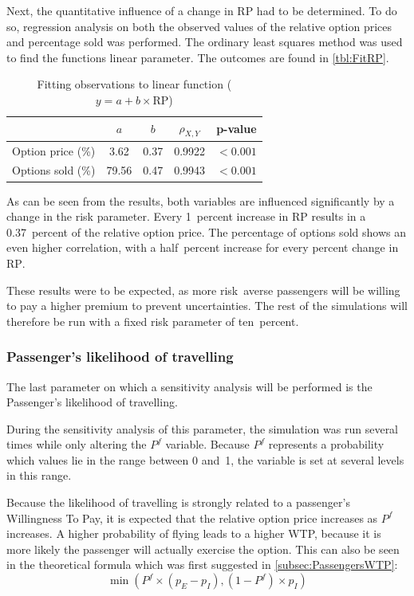 Next, the quantitative influence of a change in $\mbox{RP}$ had to be determined. To do so, regression analysis on both the observed values of the relative option prices and percentage sold was performed. The ordinary least squares method was used to find the functions linear parameter. The outcomes are found in \autoref{tbl:FitRP}.

\begin{table}
\centering
\begin{tabular}{l c c c c}
\toprule
~  &  $a$  &  $b$  &  $\rho_{X,Y}$  & p-value  \\
\midrule
Option price (\%)  &  3.62   &  0.37  &  0.9922  &  $< 0.001$ \\
Options sold (\%)  &  79.56  &  0.47  &  0.9943  &  $< 0.001$ \\
\bottomrule
\end{tabular}
\caption{Fitting observations to linear function ($y = a + b \times \mbox{RP}$)}
\label{tbl:FitRP}
\end{table}


As can be seen from the results, both variables are influenced significantly by a change in the risk parameter. Every 1~percent increase in $\mbox{RP}$ results in a 0.37~percent of the relative option price. The percentage of options sold shows an even higher correlation, with a half~percent increase for every percent change in $\mbox{RP}$.

These results were to be expected, as more risk~averse passengers will be willing to pay a higher premium to prevent uncertainties. The rest of the simulations will therefore be run with a fixed risk parameter of ten~percent.


\subsubsection{Passenger's likelihood of travelling}
The last parameter on which a sensitivity analysis will be performed is the Passenger's likelihood of travelling.

During the sensitivity analysis of this parameter, the simulation was run several times while only altering the $P^f$ variable. Because $P^f$ represents a probability which values lie in the range between 0 and~1, the variable is set at several levels in this range.

Because the likelihood of travelling is strongly related to a passenger's Willingness To Pay, it is expected that the relative option price increases as $P^f$ increases. A higher probability of flying leads to a higher WTP, because it is more likely the passenger will actually exercise the option.  This can also be seen in the theoretical formula which was first suggested in \autoref{subsec:PassengersWTP}:
\begin{equation}
\min(P^f \times (p_E - p_I), (1 - P^f) \times p_I)
\end{equation}

